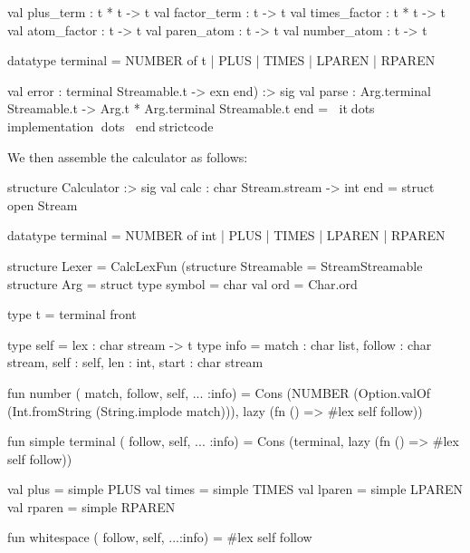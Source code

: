 \documentclass[10pt]{article}
\begin{document}
\begin{strictcode}
\begin{strictcode}
\begin{strictcode}
\begin{strictcode}
\begin{strictcode}
\begin{strictcode}
\begin{strictcode}
\begin{strictcode}
\begin{strictcode}
\begin{strictcode}
\begin{strictcode}
\begin{strictcode}
\begin{strictcode}
          val plus_term : t * t -> t
          val factor_term : t -> t
          val times_factor : t * t -> t
          val atom_factor : t -> t
          val paren_atom : t -> t
          val number_atom : t -> t

          datatype terminal =
             NUMBER of t
           | PLUS
           | TIMES
           | LPAREN
           | RPAREN

          val error : terminal Streamable.t -> exn
       end)
   :>
   sig
      val parse : Arg.terminal Streamable.t -> Arg.t * Arg.terminal Streamable.t
   end
= itdots implementation dots
endstrictcode

We then assemble the calculator as follows:

\begin{bigstrictcode}

structure Calculator
  :>
  sig
    val calc : char Stream.stream -> int
  end
  =
  struct
     open Stream

     datatype terminal =
        NUMBER of int
      | PLUS
      | TIMES
      | LPAREN
      | RPAREN

     structure Lexer =
        CalcLexFun
        (structure Streamable = StreamStreamable
         structure Arg =
            struct
               type symbol = char
               val ord = Char.ord

               type t = terminal front
    
               type self = { lex : char stream -> t }
               type info = { match : char list,
                             follow : char stream,
                             self : self,
                             len : int,
                             start : char stream }
    
               fun number ({ match, follow, self, ... }:info) =
                 Cons (NUMBER (Option.valOf (Int.fromString (String.implode match))),
                       lazy (fn () => #lex self follow))
    
               fun simple terminal ({ follow, self, ... }:info) =
                 Cons (terminal, lazy (fn () => #lex self follow))
    
               val plus = simple PLUS
               val times = simple TIMES
               val lparen = simple LPAREN
               val rparen = simple RPAREN
    
               fun whitespace ({ follow, self, ...}:info) =
                 #lex self follow
    

\end{bigstrictcode}
\end{strictcode}
\end{strictcode}
\end{strictcode}
\end{strictcode}
\end{strictcode}
\end{strictcode}
\end{strictcode}
\end{strictcode}
\end{strictcode}
\end{strictcode}
\end{strictcode}
\end{strictcode}
\end{strictcode}
\end{document}
